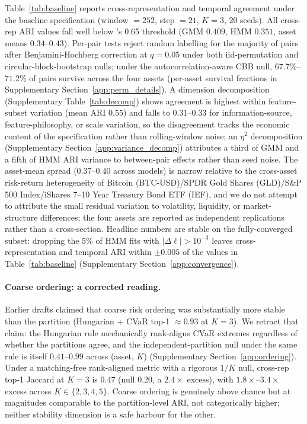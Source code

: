 \documentclass[preprint,12pt,authoryear]{elsarticle}
\newcommand{\BTC}{Bitcoin (BTC-USD)}
\newcommand{\GLD}{SPDR Gold Shares (GLD)}
\newcommand{\SPX}{S\&P 500 Index}
\newcommand{\IEF}{iShares 7--10 Year Treasury Bond ETF (IEF)}
\begin{document}
Table~\ref{tab:baseline} reports cross-representation and temporal agreement under the baseline specification (window $=252$, step $=21$, $K=3$, 20 seeds). All cross-rep ARI values fall well below \citet{Steinley2004}'s 0.65 threshold (GMM $0.409$, HMM $0.351$, asset means $0.34$--$0.43$). Per-pair tests reject random labelling for the majority of pairs after Benjamini-Hochberg correction at $q=0.05$ under both iid-permutation and \citet{PolitisRomano1992CBB} circular-block-bootstrap nulls; under the autocorrelation-aware CBB null, $67.7\%$--$71.2\%$ of pairs survive across the four assets (per-asset survival fractions in Supplementary Section~\ref{app:perm_details}). A dimension decomposition (Supplementary Table~\ref{tab:decomp}) shows agreement is highest within feature-subset variation (mean ARI $0.55$) and falls to $0.31$--$0.33$ for information-source, feature-philosophy, or scale variation, so the disagreement tracks the economic content of the specification rather than rolling-window noise; an $\eta^2$ decomposition (Supplementary Section~\ref{app:variance_decomp}) attributes a third of GMM and a fifth of HMM ARI variance to between-pair effects rather than seed noise. The asset-mean spread ($0.37$--$0.40$ across models) is narrow relative to the cross-asset risk-return heterogeneity of \BTC{}/\GLD{}/\SPX{}/\IEF{}, and we do not attempt to attribute the small residual variation to volatility, liquidity, or market-structure differences; the four assets are reported as independent replications rather than a cross-section. Headline numbers are stable on the fully-converged subset: dropping the $5\%$ of HMM fits with $|\Delta\ell|>10^{-3}$ leaves cross-representation and temporal ARI within $\pm 0.005$ of the values in Table~\ref{tab:baseline} (Supplementary Section~\ref{app:convergence}).

\paragraph{Coarse ordering: a corrected reading.}
Earlier drafts claimed that coarse risk ordering was substantially more stable than the partition (Hungarian + CVaR top-1 ${\approx}0.93$ at $K=3$). We retract that claim: the Hungarian rule mechanically rank-aligns CVaR extremes regardless of whether the partitions agree, and the independent-partition null under the same rule is itself $0.41$--$0.99$ across (asset, $K$) (Supplementary Section~\ref{app:ordering}). Under a matching-free rank-aligned metric with a rigorous $1/K$ null, cross-rep top-1 Jaccard at $K=3$ is $0.47$ (null $0.20$, a $2.4\times$ excess), with $1.8\times$--$3.4\times$ excess across $K\in\{2,3,4,5\}$. Coarse ordering is genuinely above chance but at magnitudes comparable to the partition-level ARI, not categorically higher; neither stability dimension is a safe harbour for the other.
\end{document}
